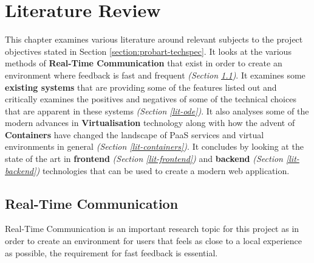 
\chapter{Literature Review} \label{lit}

This chapter examines various literature around relevant subjects to the project objectives stated in Section \ref{section:probart-techspec}. It looks at the various methods of \textbf{Real-Time Communication} that exist in order to create an environment where feedback is fast and frequent \textit{(Section \ref{lit-rtc})}. It examines some \textbf{existing systems} that are providing some of the features listed out and critically examines the positives and negatives of some of the technical choices that are apparent in these systems \textit{(Section \ref{lit-ode})}. It also analyses some of the modern advances in \textbf{Virtualisation} technology along with how the advent of \textbf{Containers} have changed the landscape of PaaS services and virtual environments in general \textit{(Section \ref{lit-containers})}. It concludes by looking at the state of the art in \textbf{frontend} \textit{(Section \ref{lit-frontend})} and \textbf{backend} \textit{(Section \ref{lit-backend})} technologies that can be used to create a modern web application. 

\section{Real-Time Communication} \label{lit-rtc}

Real-Time Communication is an important research topic for this project as in order to create an environment for users that feels as close to a local experience as possible, the requirement for fast feedback is essential.

